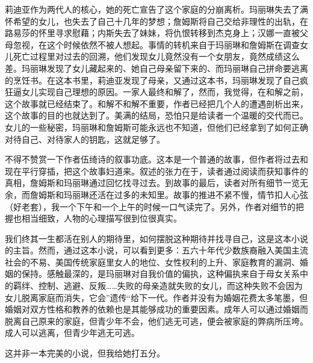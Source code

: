 莉迪亚作为两代人的核心，她的死亡宣告了这个家庭的分崩离析。玛丽琳失去了满怀希望的女儿，也失去了自己十几年的梦想；詹姆斯将自己交给非理性的出轨，在路易莎的怀里寻求慰藉；内斯失去了妹妹，将仇恨转移到杰克身上；汉娜一直被父母忽视，在这个时候依然不被人想起。事情的转机来自于玛丽琳和詹姆斯在调查女儿死亡过程里对过去的回溯，他们发现女儿竟然没有一个女朋友，竟然成绩这么差。玛丽琳发现了女儿藏起来的、她自己母亲留下来的、而玛丽琳自己拼命要逃离的烹饪书。在这本书里，莉迪亚发现了母亲，又通过这本书，玛丽琳发现了自己疯狂逼女儿实现自己理想的原因。一家人最终和解了，然而，我觉得，在和解之前，这个故事就已经结束了。和解不和解不重要，作者已经把几个人的遭遇剖析出来，这个故事的目的也就达到了。美满的结局，恐怕只是给读者一个温暖的交代而已。女儿的一些秘密，玛丽琳和詹姆斯可能永远也不知道，但他们已经拿到了如何正确对待自己、对待家人的钥匙，这就足够了。

不得不赞赏一下作者伍绮诗的叙事功底。这本是一个普通的故事，但作者将过去和现在平行穿插，把这个故事妇道来。叙述的张力在于，读者通过阅读而获知事件的真相，詹姆斯和玛丽琳通过回忆找寻过去。到故事的最后，读者对所有细节一览无余，而詹姆斯和玛丽琳还活在过多的未知里。故事的推进不紧不慢，情节扣人心弦（好老套），我一个下午和一个上午的时候一口气读完了。另外，作者对细节的把握也相当细致，人物的心理描写很到位很真实。

我们终其一生都活在别人的期待里，如何摆脱这种期待并找寻自己，这是这本小说的主旨。然而，通过这本小说，可以看到更多：五六十年代少数族裔融入美国主流社会的不易、美国传统家庭里女人的地位、女性权利的上升、家庭教育的漏洞、婚姻的保持。感触最深的，是玛丽琳对自我价值的偏执，这种偏执来自于母女关系中的羁绊、控制、逃避、反叛……失败的母亲造就失败的女儿，而这种失败不会因为女儿脱离家庭而消失，它会”遗传“给下一代。作者并没有为婚姻花费太多笔墨，但婚姻对双方性格和教养的依赖也是其能够成功的重要因素。成年人可以通过婚姻而脱离自己原来的家庭，但青少年不会，他们逃无可逃，便会被家庭的弊病所压垮。成人可以逃离，但青少年逃无可逃。

这并非一本完美的小说，但我给她打五分。
